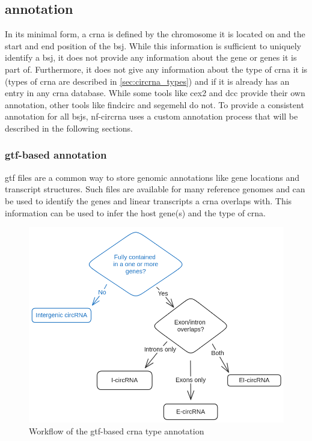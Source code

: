 \subsection{ annotation}
In its minimal form, a \gls{crna} is defined by the chromosome it is located on
and the start and end position of the \gls{bsj}.
While this information is sufficient to uniquely identify a \gls{bsj}, it does
not provide any information about the gene or genes it is part of.
Furthermore, it does not give any information about the type of \gls{crna} it
is (types of \gls{crna} are described in \cref{sec:circrna_types}) and if it is
already has an entry in any \gls{crna} database.
While some tools like \gls{cex2} and \gls{dcc} provide their own annotation,
other tools like \gls{findcirc} and \gls{segemehl} do not.
To provide a consistent annotation for all \glspl{bsj}, \gls{nf-circrna} uses a
custom annotation process that will be described in the following sections.

\subsubsection{\gls{gtf}-based annotation}
\label{sec:gtf_annotation}
\gls{gtf} files are a common way to store genomic annotations like gene
locations and
transcript structures.
Such files are available for many reference genomes and can be used to identify
the genes and linear transcripts a \gls{crna} overlaps with.
This information can be used to infer the host gene(s) and the type of
\gls{crna}.

\begin{figure}[ht]
      \centering

      \includegraphics[width=\textwidth]{chapters/3_materials_and_methods/figures/annotation.png}
      \caption{Workflow of the \gls{gtf}-based \gls{crna} type annotation}
      \label{fig:gtf_annotation}
\end{figure}

